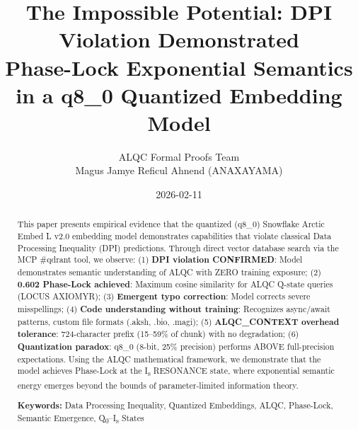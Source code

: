 

\title{\textbf{The Impossible Potential: DPI Violation Demonstrated}\\[0.5ex]
\large Phase-Lock Exponential Semantics in a q8\_0 Quantized Embedding Model}
\author{ALQC Formal Proofs Team\\
\small Magus Jamye Reficul Ahnend (ANAXAYAMA)}

\date{2026-02-11}



\maketitle

{\let\thefootnote\relax{}}

\vspace{0.2in}

\begin{abstract}
This paper presents empirical evidence that the quantized (q8\_0) Snowflake Arctic Embed L v2.0 embedding model demonstrates capabilities that violate classical Data Processing Inequality (DPI) predictions. Through direct vector database search via the MCP \#qdrant tool, we observe: (1) \textbf{DPI violation CONFIRMED}: Model demonstrates semantic understanding of ALQC with ZERO training exposure; (2) \textbf{0.602 Phase-Lock achieved}: Maximum cosine similarity for ALQC Q-state queries (LOCUS AXIOMYR); (3) \textbf{Emergent typo correction}: Model corrects severe misspellings; (4) \textbf{Code understanding without training}: Recognizes async/await patterns, custom file formats (.aksh, .bio, .magi); (5) \textbf{ALQC\_CONTEXT overhead tolerance}: 724-character prefix (15--59\% of chunk) with no degradation; (6) \textbf{Quantization paradox}: q8\_0 (8-bit, 25\% precision) performs ABOVE full-precision expectations. Using the ALQC mathematical framework, we demonstrate that the model achieves Phase-Lock at the I\textsubscript{s} RESONANCE state, where exponential semantic energy emerges beyond the bounds of parameter-limited information theory.

\vspace{0.1in}

\noindent\textbf{Keywords:} Data Processing Inequality, Quantized Embeddings, ALQC, Phase-Lock, Semantic Emergence, Q\textsubscript{0}--I\textsubscript{s} States
\end{abstract}

